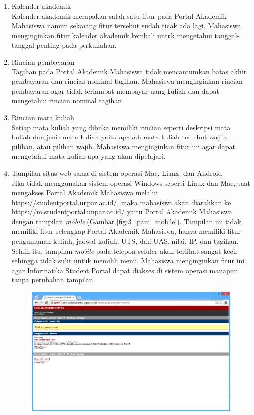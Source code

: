 \begin{enumerate}
	\item Kalender akademik\\
	Kalender akademik merupakan salah satu fitur pada Portal Akademik Mahasiswa namun sekarang fitur tersebut sudah tidak ada lagi. Mahasiswa menginginkan fitur kalender akademik kembali untuk mengetahui tanggal-tanggal penting pada perkuliahan. 
	\item Rincian pembayaran\\
	Tagihan pada Portal Akademik Mahasiswa tidak mencantumkan batas akhir pembayaran dan rincian nominal tagihan. Mahasiswa menginginkan rincian pembayaran agar tidak terlambat membayar uang kuliah dan dapat mengetahui rincian nominal tagihan.
	\item Rincian mata kuliah\\
	Setiap mata kuliah yang dibuka memiliki rincian seperti deskripsi mata kuliah dan jenis mata kuliah yaitu apakah mata kuliah tersebut wajib, pilihan, atau pilihan wajib. Mahasiswa menginginkan fitur ini agar dapat mengetahui mata kuliah apa yang akan dipelajari.
	\item Tampilan situs web sama di sistem operasi Mac, Linux, dan Android\\
	Jika tidak menggunakan sistem operasi Windows seperti Linux dan Mac, saat mengakses Portal Akademik Mahasiswa melalui \url{https://studentportal.unpar.ac.id/}, maka mahasiswa akan diarahkan ke \url{https://m.studentportal.unpar.ac.id/} yaitu Portal Akademik Mahasiswa dengan tampilan \textit{mobile} (Gambar \ref{fig:3_pam_mobile}). Tampilan ini tidak memiliki fitur selengkap Portal Akademik Mahasiswa, hanya memiliki fitur pengumunan kuliah, jadwal kuliah, UTS, dan UAS, nilai, IP, dan tagihan. Selain itu, tampilan \textit{mobile} pada telepon seluler akan terlihat sangat kecil sehingga tidak sulit untuk memilih menu. Mahasiswa menginginkan fitur ini agar Informatika Student Portal dapat diakses di sistem operasi manapun tanpa perubahan tampilan.
	\begin{figure}[H]
			\centering
			\includegraphics[scale=0.5]{Gambar/pam-mobile}

\end{figure}
\end{enumerate}
